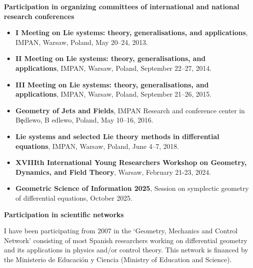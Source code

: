 \documentclass[12pt,reqno]{amsbook}
\begin{document}
{\bf Participation in organizing committees of international and national research conferences}
\vskip 0.5cm
 \begin{itemize}
 \item {\bf  I Meeting on Lie systems: theory, generalisations, and applications}, IMPAN, Warsaw, Poland, May 20--24, 2013.
\item {\bf  II Meeting on Lie systems: theory, generalisations, and applications}, IMPAN, Warsaw, Poland, September 22--27, 2014.
\item {\bf III Meeting on Lie systems: theory, generalisations, and applications}, IMPAN, Warsaw, Poland, September 21--26, 2015.
\item {\bf Geometry of Jets and Fields}, IMPAN Research and conference center in B\c edlewo, B edlewo, Poland, May 10--16, 2016.
\item {\bf Lie systems and selected Lie theory methods in differential equations}, IMPAN, Warsaw, Poland, June 4--7, 2018.
\item {\bf XVIIIth International Young Researchers Workshop on Geometry, Dynamics, and Field Theory}, Warsaw, February 21-23, 2024.
\item {\bf Geometric Science of Information 2025}, Session on symplectic geometry of differential equations, October 2025.

\end{itemize}

\vskip 0.5cm

 

\vskip 0.5cm
{\bf Participation in scientific networks}
\vskip 0.5cm

I have been participating from 2007 in the `Geometry, Mechanics and Control Network' consisting of most Spanish researchers working on differential geometry and its applications in physics and/or control theory. This network is financed by the  Ministerio de Educaci\'on y Ciencia (Ministry of Education and Science).
\end{document}
